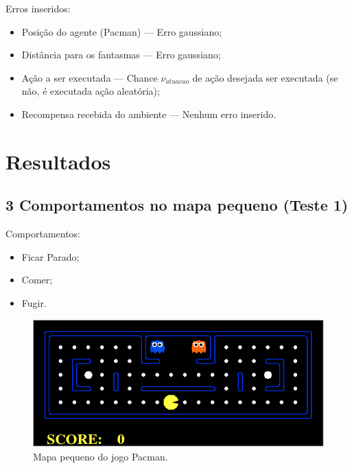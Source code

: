\documentclass{beamer}
\begin{document}

\begin{frame}
Erros inseridos:\pause
\begin{itemize}
	\item Posição do agente (Pacman) --- Erro gaussiano;\pause
	\item Distância para os fantasmas --- Erro gaussiano;\pause
	\item Ação a ser executada --- Chance $ \nu_{atuacao} $ de ação desejada ser executada (se não, é executada ação aleatória);\pause
	\item Recompensa recebida do ambiente --- Nenhum erro inserido.
\end{itemize}
\end{frame}

\section{Resultados}

\subsection{3 Comportamentos no mapa pequeno (Teste 1)}

\begin{frame}
Comportamentos:
\begin{itemize}
	\item Ficar Parado;
	\item Comer;
	\item Fugir.
\end{itemize}

\begin{figure}[h]
    \centering
    \includegraphics[width=0.6\linewidth]{images/pacman_small_map}
    \caption{Mapa pequeno do jogo Pacman.}
    \label{img:PlataformaPacmanMapaPequeno}
\end{figure}
\end{frame}

\end{document}
